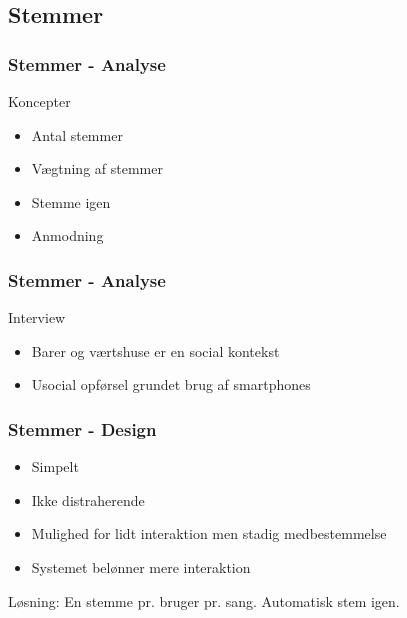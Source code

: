 \subsection{Stemmer}

\begin{frame}
	\frametitle{Stemmer - Analyse}
	Koncepter
	\begin{itemize}
		\item Antal stemmer
		\item Vægtning af stemmer
		\item Stemme igen
		\item Anmodning
	\end{itemize}
\end{frame}

\begin{frame}
	\frametitle{Stemmer - Analyse}
	Interview
	\begin{itemize}
		\item Barer og værtshuse er en social kontekst
		\item Usocial opførsel grundet brug af smartphones
	\end{itemize}
\end{frame}

\begin{frame}
	\frametitle{Stemmer - Design}
	\begin{itemize}
		\item Simpelt
		\item Ikke distraherende
		\item Mulighed for lidt interaktion men stadig medbestemmelse
		\item Systemet belønner mere interaktion
	\end{itemize}
	Løsning: En stemme pr. bruger pr. sang. Automatisk stem igen.
\end{frame}